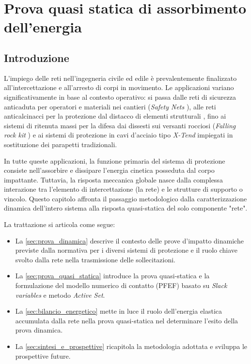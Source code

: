 \chapter{Prova quasi statica di assorbimento dell'energia}\label{chap:capitolo3}

\section{Introduzione}
L'impiego delle reti nell'ingegneria civile ed edile è prevalentemente finalizzato all'intercettazione e all'arresto di corpi in movimento. Le applicazioni variano significativamente in base al contesto operativo: si passa dalle reti di sicurezza anticaduta per operatori e materiali nei cantieri (\textit{Safety Nets} \cite{EN1263-1,EN1263-2}), alle reti anticalcinacci per la protezione dal distacco di elementi strutturali \cite{UNI11808-3,UNI11808-4}, fino ai sistemi di ritenuta massi per la difesa dai dissesti sui versanti rocciosi (\textit{Falling rock kit} \cite{EAD-FRK}) e ai sistemi di protezione in cavi d'acciaio tipo \textit{X-Tend} \cite{EAD-XTEND,ETA-XTEND} impiegati in sostituzione dei parapetti tradizionali.

In tutte queste applicazioni, la funzione primaria del sistema di protezione consiste nell'assorbire e dissipare l'energia cinetica posseduta dal corpo impattante. Tuttavia, la risposta meccanica globale nasce dalla complessa interazione tra l'elemento di intercettazione (la rete) e le strutture di supporto o vincolo. Questo capitolo affronta il passaggio metodologico dalla caratterizzazione dinamica dell'intero sistema alla risposta quasi-statica del solo componente "rete". 

La trattazione si articola come segue:
\begin{itemize}
    \item La \cref{sec:prova_dinamica} descrive il contesto delle prove d'impatto dinamiche previste dalla normativa per i diversi sistemi di protezione e il ruolo chiave svolto dalla rete nella trasmissione delle sollecitazioni.
    \item La \cref{sec:prova_quasi_statica} introduce la prova quasi-statica e la formulazione del modello numerico di contatto (PFEF) basato su \textit{Slack variables} e metodo \textit{Active Set}.
    \item La \cref{sec:bilancio_energetico} mette in luce il ruolo dell'energia elastica accumulata dalla rete nella prova quasi-statica nel determinare l'esito della prova dinamica.
    \item La \cref{sec:sintesi_e_prospettive} ricapitola la metodologia adottata e sviluppa le prospettive future.  
\end{itemize}

